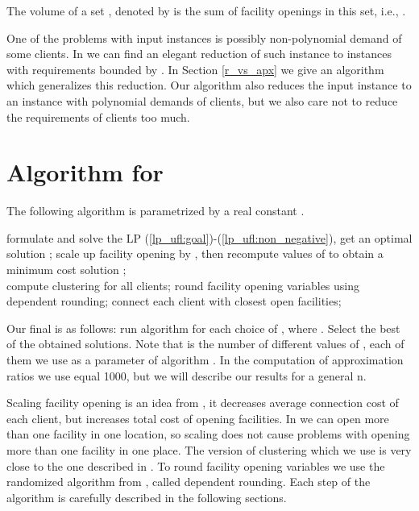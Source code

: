 \documentclass{llncs}
\begin{document}
\begin{definition}
 The volume of a set , denoted by  is the sum of facility openings in this set, i.e., .
\end{definition}

One of the problems with input instances is possibly non-polynomial demand of some clients. In \cite{Yan} we can find an elegant reduction of such instance to instances with requirements bounded by . In Section \ref{r_vs_apx} we give an algorithm which generalizes this reduction. Our algorithm also reduces the input instance to an instance with polynomial demands of clients, but we also care not to reduce the requirements of clients too much.

\section{Algorithm for }
The following algorithm  is parametrized by a real constant .
\begin{algorithm}
  \caption{}
\begin{algorithmic}[1]
 \STATE formulate and solve the LP (\ref{lp_ufl:goal})-(\ref{lp_ufl:non_negative}), get an optimal solution ;
 \STATE scale up facility opening by , then recompute values of  to obtain a minimum cost solution ;\\
 \STATE compute clustering for all clients;
 \STATE round facility opening variables using dependent rounding;
 \STATE connect each client  with  closest open facilities;
\end{algorithmic}
\end{algorithm}
Our final  is as follows: run algorithm  for each choice of , where . Select the best of the obtained solutions. Note that  is the number of different values of , each of them we use as a parameter of algorithm . In the computation of approximation ratios we use  equal 1000, but we will describe our results for a general n.

Scaling facility opening is an idea from \cite{Aardal}, it decreases average connection cost of each client, but increases total cost of opening facilities. In  we can open more than one facility in one location, so scaling does not cause problems with opening more than one facility in one place. The version of clustering which we use is very close to the one described in \cite{Chudak}. To round facility opening variables we use the randomized algorithm from \cite{Aravind}, called dependent rounding. Each step of the algorithm  is carefully described in the following sections.
\end{document}
